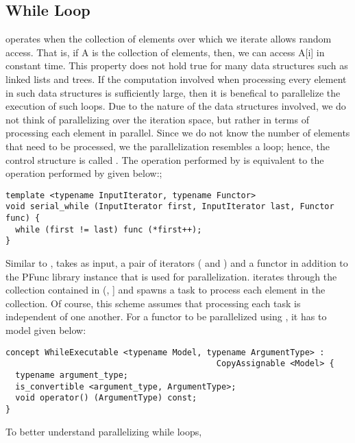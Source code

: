 \subsection{While Loop}
\label{subsec:while}
%
 operates when the collection of elements over which
we iterate allows random access. 
%
That is, if A is the collection of elements, then, we can access A[i] in
constant time. 
%
This property does not hold true for many data structures such as linked lists
and trees. 
%
If the computation involved when processing every element in such data
structures is sufficiently large, then it is benefical to parallelize the
execution of such loops.
%
Due to the nature of the data structures involved, we do not think of 
parallelizing over the iteration space, but rather in terms of processing 
each element in parallel. 
%
Since we do not know the number of elements that need to be processed, we the 
parallelization resembles a  loop; hence, the control structure 
is called .
%
The operation performed by  is equivalent to the 
operation performed by  given below:;
%
\begin{center}
\begin{minipage}{0.7\textwidth}
\begin{lstlisting}
template <typename InputIterator, typename Functor>
void serial_while (InputIterator first, InputIterator last, Functor func) {
  while (first != last) func (*first++);
}
\end{lstlisting}
\end{minipage}
\end{center}
%
Similar to ,  takes as input, a pair
of iterators ( and ) and a functor in addition to the
PFunc library instance that is used for parallelization.
%
 iterates through the collection contained in
(, ] and spawns a task to process each element in 
the collection.
%
Of course, this scheme assumes that processing each task is independent of one
another.
%
For a functor to be parallelized using , it has to 
model  given below:
%
\begin{center}
\begin{minipage}{0.7\textwidth}
\begin{lstlisting}
concept WhileExecutable <typename Model, typename ArgumentType> : 
                                           CopyAssignable <Model> {
  typename argument_type;
  is_convertible <argument_type, ArgumentType>;
  void operator() (ArgumentType) const;
}
\end{lstlisting}
\end{minipage}
\end{center}
%
To better understand parallelizing while loops, 
